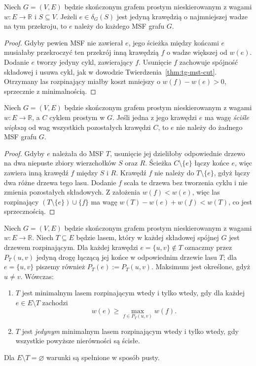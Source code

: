 \begin{wniosek}
\label{cor:tg-mst-strict-cut}
Niech $G=(V,E)$ będzie skończonym grafem prostym
nieskierowanym z wagami $w:E\to\mathbb R$ i $S\subseteq V$.
Jeżeli $e\in\delta_G(S)$ jest jedyną krawędzią o najmniejszej
wadze na tym przekroju,
to $e$ należy do każdego MSF grafu $G$.
\end{wniosek}
\begin{proof}
Gdyby pewien MSF nie zawierał $e$, jego ścieżka
między końcami $e$ musiałaby przekroczyć ten
przekrój inną krawędzią $f$ o wadze większej
od $w(e)$. Dodanie $e$ tworzy jedyny cykl,
zawierający $f$. Usunięcie $f$ zachowuje spójność
składowej i usuwa cykl, jak w dowodzie
Twierdzenia~\ref{thm:tg-mst-cut}.
Otrzymany las rozpinający miałby koszt mniejszy
o $w(f)-w(e)>0$, sprzecznie z minimalnością.
\end{proof}

\begin{twierdzenie}
\label{thm:tg-mst-cycle}
Niech $G=(V,E)$ będzie skończonym grafem prostym
nieskierowanym z wagami $w:E\to\mathbb R$,
a $C$ cyklem prostym w $G$. Jeśli jedna z jego krawędzi
$e$ ma wagę \emph{ściśle większą} od wag wszystkich
pozostałych krawędzi $C$, to $e$ nie należy
do żadnego MSF grafu $G$.
\end{twierdzenie}
\begin{proof}
Gdyby $e$ należała do MSF $T$, usunięcie
jej dzieliłoby odpowiednie drzewo na dwa
niepuste zbiory wierzchołków $S$ oraz $R$.
Ścieżka $C\setminus\{e\}$ łączy końce $e$,
więc zawiera inną krawędź $f$ między $S$ i $R$.
Krawędź $f$ nie należy do $T\setminus\{e\}$,
gdyż łączy dwa różne drzewa tego lasu.
Dodanie $f$ scala te drzewa bez tworzenia cyklu
i nie zmienia pozostałych składowych.
Z założenia $w(f)<w(e)$, więc las rozpinający
$(T\setminus\{e\})\cup\{f\}$ ma wagę
$w(T)-w(e)+w(f)<w(T)$, co jest sprzecznością.
\end{proof}

\begin{twierdzenie}
\label{thm:tg-mst-certificate}
Niech $G=(V,E)$ będzie skończonym grafem
prostym nieskierowanym z wagami
$w:E\to\mathbb R$.
Niech $T\subseteq E$ będzie lasem,
który w każdej składowej spójnej $G$
jest drzewem rozpinającym.
Dla każdej krawędzi $e=\{u,v\}\notin T$
oznaczmy przez $P_T(u,v)$
jedyną drogę łączącą jej końce
w odpowiednim drzewie lasu $T$; dla $e=\{u,v\}$
piszemy również $P_T(e):=P_T(u,v)$.
Maksimum jest określone, gdyż $u\ne v$.
Wówczas:
\begin{enumerate}[label=(\roman*)]
\item $T$ jest minimalnym lasem
rozpinającym wtedy i tylko wtedy,
gdy dla każdej $e\in E\setminus T$
zachodzi
\[
w(e)\geq\max_{f\in P_T(u,v)}w(f).
\]
\item $T$ jest \emph{jedynym}
minimalnym lasem rozpinającym
wtedy i tylko wtedy, gdy wszystkie
powyższe nierówności są ścisłe.
\end{enumerate}
Dla $E\setminus T=\varnothing$
warunki są spełnione w sposób pusty.
\end{twierdzenie}

